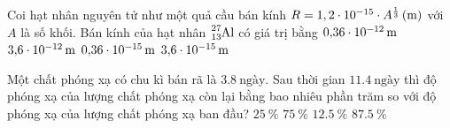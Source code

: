 \begin{ex}
	Coi hạt nhân nguyên tử như một quả cầu bán kính $R=\xsi{1,2\cdot10^{-15}\cdot A^{\frac{1}{3}}}{\left(\meter\right)}$ với $A$ là số khối. Bán kính của hạt nhân $\ce{^{27}_{13}Al}$ có giá trị bằng
	\choice
	{$\SI{0.36E-12}{\meter}$}
	{$\SI{3.6E-12}{\meter}$}
	{$\SI{0.36E-15}{\meter}$}
	{\True $\SI{3.6E-15}{\meter}$}
	\loigiai{}
\end{ex}
\begin{ex}
	Một chất phóng xạ có chu kì bán rã là $\SI{3.8}{\text{ngày}}$. Sau thời gian $\SI{11.4}{\text{ngày}}$ thì độ phóng xạ của lượng chất phóng xạ còn lại bằng bao nhiêu phần trăm so với độ phóng xạ của lượng chất  phóng xạ ban đầu?
	\choice
	{$\SI{25}{\percent}$}
	{$\SI{75}{\percent}$}
	{\True $\SI{12.5}{\percent}$}
	{$\SI{87,5}{\percent}$}
\end{ex}

